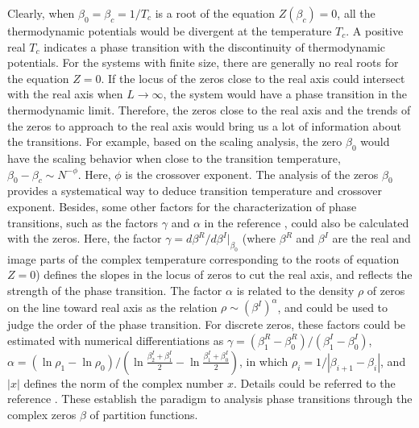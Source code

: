 \documentclass[aps,pre,twocolumn,showpacs,preprintnumbers,amsmath,amssymb]{revtex4-1}
\begin{document}
Clearly, when $\beta_0=\beta_c=1/T_c$ is a root of the equation $Z(\beta_c)=0$,
all the thermodynamic potentials would be divergent at the temperature $T_c$.
A positive real $T_c$ indicates a phase
transition with the discontinuity of thermodynamic potentials. For the systems
with finite size, there are generally no real roots for the equation $Z=0$.
If the locus of the zeros close to the real axis could intersect with the
real axis when $L\rightarrow\infty$, the system would have a phase transition
in the thermodynamic limit. Therefore, the zeros close to the real axis and
the trends of the zeros to approach to the real axis would bring us a lot of
information about the transitions. For example, based on the scaling analysis,
the zero $\beta_0$ would have the scaling behavior when close to the
transition temperature, $\beta_0-\beta_c\sim N^{-\phi}$. Here, $\phi$ is
the crossover exponent. The analysis of the zeros $\beta_0$ provides a
systematical way to deduce transition temperature and crossover exponent.
Besides, some other factors for the characterization of phase transitions, such as
the factors $\gamma$ and $\alpha$ in the reference \cite{WangJCP03}, could also
be calculated with the zeros. Here, the factor $\gamma=d \beta^R/d \beta^I|_{\beta_0}$
(where $\beta^R$ and $\beta^I$ are the real and image parts of the complex
temperature corresponding to the roots of equation $Z=0$) defines the slopes
in the locus of zeros to cut the real axis, and reflects the strength of the phase
transition. The factor $\alpha$ is related to the density $\rho$ of zeros on
the line toward real axis as the relation $\rho \sim (\beta^I)^{\alpha}$,
and could be used to judge the order of the phase transition.
For discrete zeros, these factors could be estimated with numerical
differentiations as $\gamma=(\beta_1^R-\beta_0^R)/(\beta^I_1-\beta^I_0)$,
$\alpha=(\ln \rho_1-\ln \rho_0)/(\ln\frac{\beta_2^I+\beta_1^I}{2}-
\ln\frac{\beta_1^I+\beta_0^I}{2})$, in which $\rho_i=1/|\beta_{i+1}-\beta_i|$,
and $|x|$ defines the norm
of the complex number $x$. Details could be referred to the reference
\cite{WangJCP03}.  These establish the paradigm to analysis
phase transitions through the complex zeros $\beta$ of partition functions.

\end{document}
